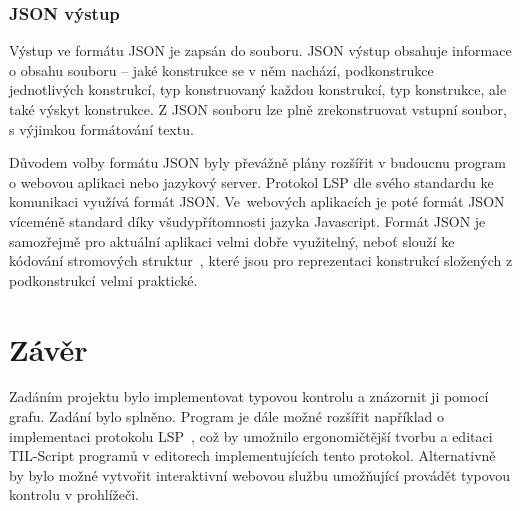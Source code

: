 \documentclass{article}
\begin{document}
\subsubsection{JSON výstup}

Výstup ve formátu JSON je zapsán do souboru. JSON výstup obsahuje informace o obsahu souboru -- jaké konstrukce
se v něm nachází, podkonstrukce jednotlivých konstrukcí, typ konstruovaný každou konstrukcí, typ konstrukce,
ale také výskyt konstrukce. Z JSON souboru lze plně zrekonstruovat vstupní soubor, s výjimkou formátování textu.

Důvodem volby formátu JSON byly převážně plány rozšířit v budoucnu program o webovou aplikaci nebo jazykový server.
Protokol LSP dle svého standardu ke komunikaci využívá formát JSON. Ve~webových aplikacích je poté formát JSON
víceméně standard díky všudypřítomnosti jazyka Javascript. Formát JSON je samozřejmě pro aktuální aplikaci
velmi dobře využitelný, neboť slouží ke kódování stromových struktur~\cite{json-src}, které jsou pro reprezentaci konstrukcí
složených z podkonstrukcí velmi praktické.

\section{Závěr}

Zadáním projektu bylo implementovat typovou kontrolu a znázornit ji pomocí grafu. Zadání bylo splněno. Program
je dále možné rozšířit například o implementaci protokolu LSP~\cite{lsp-src}, což by umožnilo ergonomičtější tvorbu a editaci
TIL-Script programů v editorech implementujících tento protokol. Alternativně by bylo možné vytvořit interaktivní
webovou službu umožňující provádět typovou kontrolu v prohlížeči.
\end{document}
